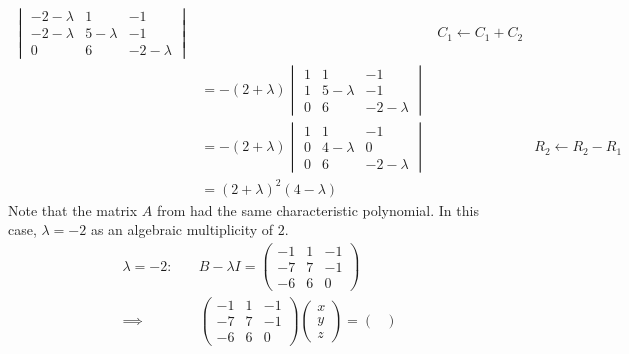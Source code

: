 \begin{exm}
\begin{enumerate}
\begin{align*}
\begin{vmatrix}
				      -2-\lambda & 1         & -1         \\
				      -2-\lambda & 5-\lambda & -1         \\
				      0          & 6         & -2-\lambda
			      \end{vmatrix}              &  & \text{$C_1 \leftarrow C_1+C_2$} \\
			                          & = -(2+\lambda) \begin{vmatrix}
				      1 & 1         & -1         \\
				      1 & 5-\lambda & -1         \\
				      0 & 6         & -2-\lambda
			      \end{vmatrix}                                      \\
			                          & = -(2+\lambda) \begin{vmatrix}
				      1 & 1         & -1         \\
				      0 & 4-\lambda & 0          \\
				      0 & 6         & -2-\lambda
			      \end{vmatrix} &  & \text{$R_2 \leftarrow R_2-R_1$} \\
			                          & = (2+\lambda)^2(4-\lambda)
		      \end{align*}
		      Note that the matrix $A$ from 
		      had the same characteristic polynomial. In this case, $\lambda=-2$ as an algebraic
		      multiplicity of $2$.
		      \begin{align*}
			      \boxed{\lambda=-2}:\quad & B - \lambda I = \begin{pmatrix}
				      -1 & 1 & -1 \\
				      -7 & 7 & -1 \\
				      -6 & 6 & 0
			      \end{pmatrix}                                                                                             \\
			      \implies
			                               & \begin{pmatrix}
				      -1 & 1 & -1 \\
				      -7 & 7 & -1 \\
				      -6 & 6 & 0
			      \end{pmatrix}\begin{pmatrix}
				      x \\ y \\ z
			      \end{pmatrix}=\begin{pmatrix}

\end{pmatrix}
\end{align*}
\end{enumerate}
\end{exm}
